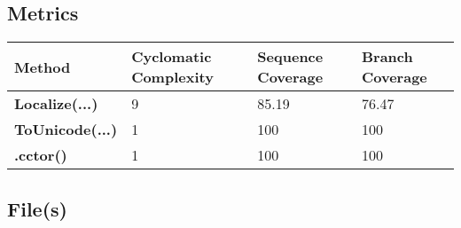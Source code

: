 \documentclass[a4paper,10pt]{article}
\begin{document}
\subsection{Metrics}
\begin{longtable}[l]{|l|l|l|l|}
\hline
\textbf{Method} & \textbf{Cyclomatic Complexity} & \textbf{Sequence Coverage} & \textbf{Branch Coverage}\\
\hline
\textbf{Localize(...)} & 9 & 85.19 & 76.47\\
\hline
\textbf{ToUnicode(...)} & 1 & 100 & 100\\
\hline
\textbf{.cctor()} & 1 & 100 & 100\\
\hline
\end{longtable}
\subsection{File(s)}
\end{document}
